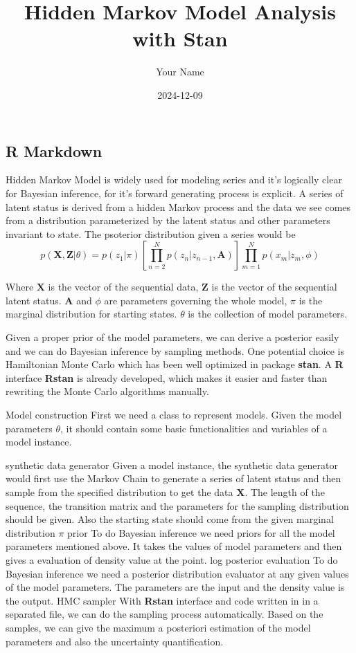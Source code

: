 \documentclass[
]{article}
\title{Hidden Markov Model Analysis with Stan}
\author{Your Name}
\date{2024-12-09}
\begin{document}
\maketitle

{
\setcounter{tocdepth}{2}
\tableofcontents
}
\subsection{R Markdown}\label{r-markdown}

Hidden Markov Model \cite{bishop2006pattern}is widely used for modeling
series and it's logically clear for Bayesian inference, for it's forward
generating process is explicit. A series of latent status is derived
from a hidden Markov process and the data we see comes from a
distribution parameterized by the latent status and other parameters
invariant to state. The psoterior distribution given a series would be
\[
p(\mathbf{X}, \mathbf{Z} | \theta) = p(z_1 | \pi) \left[ \prod_{n=2}^{N} p(z_n | z_{n-1}, \mathbf{A}) \right] \prod_{m=1}^{N} p(x_m | z_m, \phi)
\]

Where \(\mathbf{X}\) is the vector of the sequential data,
\(\mathbf{Z}\) is the vector of the sequential latent status.
\(\mathbf{A}\) and \(\phi\) are parameters governing the whole model,
\(\pi\) is the marginal distribution for starting states. \(\theta\) is
the collection of model parameters.

Given a proper prior of the model parameters, we can derive a posterior
easily and we can do Bayesian inference by sampling methods. One
potential choice is Hamiltonian Monte Carlo which has been well
optimized in package \textbf{stan}. A \textbf{R} interface
\textbf{Rstan}\cite{rstan} is already developed, which makes it easier
and faster than rewriting the Monte Carlo algorithms manually.

Model construction First we need a class to represent models. Given the
model parameters \(\theta\), it should contain some basic
functionalities and variables of a model instance.

synthetic data generator Given a model instance, the synthetic data
generator would first use the Markov Chain to generate a series of
latent status and then sample from the specified distribution to get the
data \(\mathbf{X}\). The length of the sequence, the transition matrix
and the parameters for the sampling distribution should be given. Also
the starting state should come from the given marginal distribution
\(\pi\) prior To do Bayesian inference we need priors for all the model
parameters mentioned above. It takes the values of model parameters and
then gives a evaluation of density value at the point. log posterior
evaluation To do Bayesian inference we need a posterior distribution
evaluator at any given values of the model parameters. The parameters
are the input and the density value is the output. HMC sampler With
\textbf{Rstan} interface and code written in  in a separated
file, we can do the sampling process automatically. Based on the
samples, we can give the maximum a posteriori estimation of the model
parameters and also the uncertainty quantification.
\end{document}
